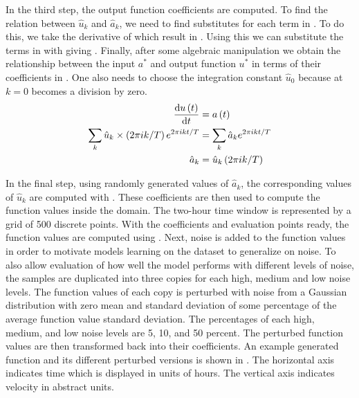 In the third step, the output function coefficients are computed. To find the relation between \(\hat{u}_k \) and \(\hat{a}_k \), we need to find substitutes for each term in . To do this, we take the derivative of  which result in . Using this we can substitute the terms in  with  giving . Finally, after some algebraic manipulation we obtain the relationship between the input \(a^*\) and output function \(u^*\) in terms of their coefficients in . One also needs to choose the integration constant \(\hat{u}_{0}\) because at \(k=0\)  becomes a division by zero.
\begin{align}
  \dv{u\left( t \right)}{t}                                        & = a\left(t\right) \label{eq:fourier_series_derivative}                                                             \\
  \sum_{k} \hat{u}_k\times \left( 2\pi ik/T \right) e^{2\pi ikt/T} & = \sum_{k} \hat{a}_k e^{2\pi ikt/T} \label{eq:example_spectral_method_fourier_substituted}                         \\
  \hat{a}_k                                                        & = \hat{u}_k\left( 2\pi ik/T \right)                                                    \label{eq:derivative_coeff}
\end{align}

In the final step, using randomly generated values of \(\hat{a}_k\), the corresponding values of \(\hat{u}_k\) are computed with . These coefficients are then used to compute the function values inside the domain. The two-hour time window is represented by a grid of \num{500} discrete points. With the coefficients and evaluation points ready, the function values are computed using . Next, noise is added to the function values in order to motivate models learning on the dataset to generalize on noise. To also allow evaluation of how well the model performs with different levels of noise, the samples are duplicated into three copies for each high, medium and low noise levels. The function values of each copy is perturbed with noise from a Gaussian distribution with zero mean and standard deviation of some percentage of the average function value standard deviation. The percentages of each high, medium, and low noise levels are 5, 10, and 50 percent. The perturbed function values are then transformed back into their coefficients. An example generated function and its different perturbed versions is shown in . The horizontal axis indicates time which is displayed in units of hours. The vertical axis indicates velocity in abstract units.

